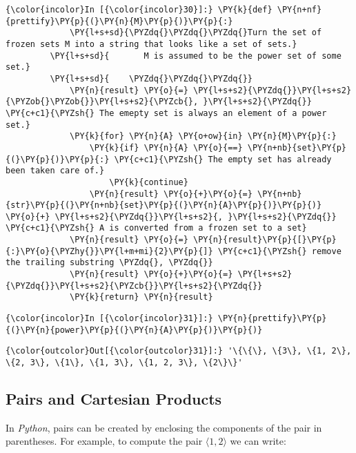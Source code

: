 \begin{Verbatim}[commandchars=\\\{\}]
{\color{incolor}In [{\color{incolor}30}]:} \PY{k}{def} \PY{n+nf}{prettify}\PY{p}{(}\PY{n}{M}\PY{p}{)}\PY{p}{:}
             \PY{l+s+sd}{\PYZdq{}\PYZdq{}\PYZdq{}Turn the set of frozen sets M into a string that looks like a set of sets.}
         \PY{l+s+sd}{       M is assumed to be the power set of some set.}
         \PY{l+s+sd}{    \PYZdq{}\PYZdq{}\PYZdq{}}
             \PY{n}{result} \PY{o}{=} \PY{l+s+s2}{\PYZdq{}}\PY{l+s+s2}{\PYZob{}\PYZob{}}\PY{l+s+s2}{\PYZcb{}, }\PY{l+s+s2}{\PYZdq{}}   \PY{c+c1}{\PYZsh{} The emepty set is always an element of a power set.}
             \PY{k}{for} \PY{n}{A} \PY{o+ow}{in} \PY{n}{M}\PY{p}{:}
                 \PY{k}{if} \PY{n}{A} \PY{o}{==} \PY{n+nb}{set}\PY{p}{(}\PY{p}{)}\PY{p}{:} \PY{c+c1}{\PYZsh{} The empty set has already been taken care of.}
                     \PY{k}{continue}
                 \PY{n}{result} \PY{o}{+}\PY{o}{=} \PY{n+nb}{str}\PY{p}{(}\PY{n+nb}{set}\PY{p}{(}\PY{n}{A}\PY{p}{)}\PY{p}{)} \PY{o}{+} \PY{l+s+s2}{\PYZdq{}}\PY{l+s+s2}{, }\PY{l+s+s2}{\PYZdq{}} \PY{c+c1}{\PYZsh{} A is converted from a frozen set to a set}
             \PY{n}{result} \PY{o}{=} \PY{n}{result}\PY{p}{[}\PY{p}{:}\PY{o}{\PYZhy{}}\PY{l+m+mi}{2}\PY{p}{]} \PY{c+c1}{\PYZsh{} remove the trailing substring \PYZdq{}, \PYZdq{}}
             \PY{n}{result} \PY{o}{+}\PY{o}{=} \PY{l+s+s2}{\PYZdq{}}\PY{l+s+s2}{\PYZcb{}}\PY{l+s+s2}{\PYZdq{}}
             \PY{k}{return} \PY{n}{result}
\end{Verbatim}


\begin{Verbatim}[commandchars=\\\{\}]
{\color{incolor}In [{\color{incolor}31}]:} \PY{n}{prettify}\PY{p}{(}\PY{n}{power}\PY{p}{(}\PY{n}{A}\PY{p}{)}\PY{p}{)}
\end{Verbatim}


\begin{Verbatim}[commandchars=\\\{\}]
{\color{outcolor}Out[{\color{outcolor}31}]:} '\{\{\}, \{3\}, \{1, 2\}, \{2, 3\}, \{1\}, \{1, 3\}, \{1, 2, 3\}, \{2\}\}'
\end{Verbatim}
            
\subsection{Pairs and Cartesian
Products}\label{pairs-and-cartesian-products}
In \textsl{Python}, pairs can be created by enclosing the components of
the pair in parentheses. For example, to compute the pair
\(\langle 1, 2 \rangle\) we can write:

